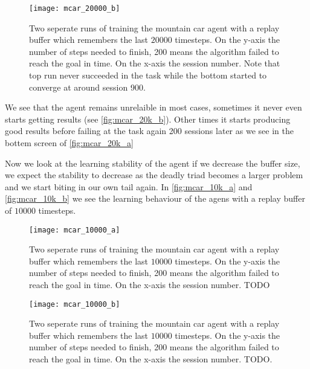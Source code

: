 \begin{figure}
    \texttt{[image: mcar\_20000\_b]}
    \caption{Two seperate runs of training the mountain car agent with a replay buffer which remembers the last $20000$ timesteps. On the y-axis the number of steps needed to finish, 200 means the algorithm failed to reach the goal in time. On the x-axis the session number. Note that top run never succeeded in the task while the bottom started to converge at around session 900.}
    \label{fig:mcar_20k_b}
\end{figure}

We see that the agent remains unrelaible in most cases, sometimes it never even starts getting results (see \autoref{fig:mcar_20k_b}). Other times it starts producing good results before failing at the task again 200 sessions later as we see in the bottem screen of  \autoref{fig:mcar_20k_a}

Now we look at the learning stability of the agent if we decrease the buffer size, we expect the stability to decrease as the deadly triad becomes a larger problem and we start biting in our own tail again. In \autoref{fig:mcar_10k_a} and \autoref{fig:mcar_10k_b} we see the learning behaviour of the agens with a replay buffer of $10 000$ timesteps.

\begin{figure}
    \texttt{[image: mcar\_10000\_a]}
    \caption{Two seperate runs of training the mountain car agent with a replay buffer which remembers the last $10000$ timesteps. On the y-axis the number of steps needed to finish, 200 means the algorithm failed to reach the goal in time. On the x-axis the session number. TODO}
    \label{fig:mcar_10k_a}
\end{figure}

\begin{figure}
    \texttt{[image: mcar\_10000\_b]}
    \caption{Two seperate runs of training the mountain car agent with a replay buffer which remembers the last $10000$ timesteps. On the y-axis the number of steps needed to finish, 200 means the algorithm failed to reach the goal in time. On the x-axis the session number. TODO.}
    \label{fig:mcar_10k_b}
\end{figure}